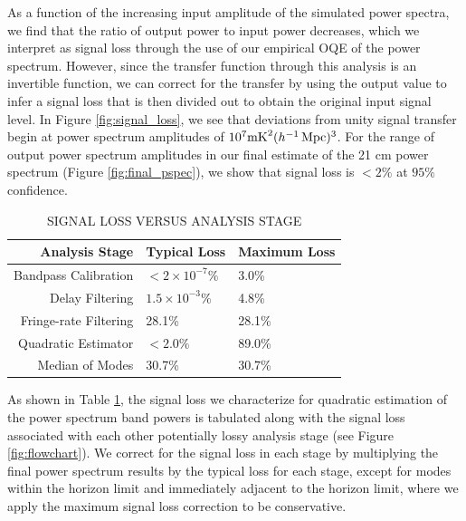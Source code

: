\documentclass[twocolumn,numberedappendix]{emulateapj} \shorttitle{New Limits on the 21 cm Power Spectrum at $z=8.4$}
\begin{document}
As a function of the increasing input amplitude of the simulated power spectra,
we find that the ratio of output power to input power decreases, which we interpret
 as signal loss through the use of our empirical OQE of the power spectrum.  
However, since the transfer function through this analysis is an invertible function,
we can correct for the transfer by using the output value to infer a signal loss
that is then divided out to obtain the original input signal level.  In Figure \ref{fig:signal_loss},
we see that
deviations from unity signal transfer begin at
power spectrum amplitudes of $10^{7} \text{mK}^{2} (h^{-1}\rm
\,\text{Mpc})^{3}$. For the range of output power spectrum amplitudes in our
final estimate of the 21 cm power spectrum (Figure \ref{fig:final_pspec}), we
show that signal loss is $<2\%$ at $95\%$ confidence. 

\begin{table}[htdp]
\caption{SIGNAL LOSS VERSUS ANALYSIS STAGE}
\begin{center}
\begin{tabular}{rll}
Analysis Stage & Typical Loss & Maximum Loss \\
\hline
Bandpass Calibration &  $< 2 \times 10^{-7}\%$ & 3.0\% \\
Delay Filtering & $1.5\times10^{-3}\%$ & 4.8\% \\
Fringe-rate Filtering & 28.1\% & 28.1\% \\
Quadratic Estimator & $<2.0\%$ & 89.0\% \\
Median of Modes & 30.7\% & 30.7\% \\
\end{tabular}
\end{center}
\label{tbl:sigloss}
\end{table}%

As shown in Table \ref{tbl:sigloss}, the signal loss we characterize for quadratic
estimation of the power spectrum band powers is tabulated along with the signal
loss associated with each other potentially lossy analysis stage (see Figure \ref{fig:flowchart}).
We correct for the signal loss in each stage by multiplying the final power spectrum results
by the typical loss for each stage, except for modes within the horizon limit and immediately
adjacent to the horizon limit, where we apply the maximum signal loss correction to be conservative.

\end{document}
